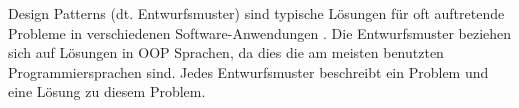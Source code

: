Design Patterns (dt. Entwurfsmuster) sind typische Lösungen für oft auftretende Probleme in verschiedenen Software-Anwendungen \cite{OOPPaterns}. 
Die Entwurfsmuster beziehen sich auf Lösungen in OOP Sprachen, da dies die am meisten benutzten Programmiersprachen sind. 
Jedes Entwurfsmuster beschreibt ein Problem und eine Lösung zu diesem Problem.
